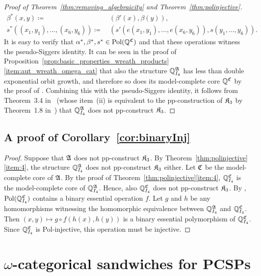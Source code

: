\begin{proof}[Proof of Theorem~\ref{thm:removing_algebraicity} and Theorem~\ref{thm:polinjective}]
\begin{align*}
    \beta^{\ast}(x,y)\coloneqq \ & (\beta'(x),\beta(y)), \\
    s^{\ast}((x_1,y_1),\dots, (x_6,y_6))\coloneqq \ & (s'(e(x_1,y_1),\dots, e(x_6,y_6)),s(y_1,\dots, y_6)).
\end{align*} 
%
It is easy to verify that $\alpha^{\ast},\beta^{\ast},s^{\ast}\in \mathrm{Pol}(\mathbb{Q}^{\mathfrak{C}})$ and that these operations witness the pseudo-Siggers identity.
%
It can be seen in the proof of Proposition~\ref{prop:basic_properties_wreath_products}\eqref{item:aut_wreath_omega_cat} that also the structure $\mathbb{Q}^{\mathfrak{A}}_{I_4}$ has less than double exponential orbit growth, and therefore so does its model-complete core $\mathbb{Q}^{\mathfrak{C}}$ by the proof of \cite[Corollary 1.8]{barto2019equations}. 
%
Combining this with the pseudo-Siggers identity, it follows from Theorem~3.4 in~\cite{barto2019equations} (whose item~(ii) is equivalent to the pp-construction of $\mathfrak{K}_3$ by Theorem~1.8 in~\cite{barto2018wonderland}) that $\mathbb{Q}^{\mathfrak{A}}_{I_4}$ does not pp-construct $\mathfrak{K}_3$.
%  
\end{proof} 
 

\subsection{A proof of Corollary~\ref{cor:binaryInj}}

\binaryInj*

\begin{proof} 
%
Suppose that $\mathfrak{A}$ does not pp-construct $\mathfrak{K}_3$.
%
By Theorem~\ref{thm:polinjective}\eqref{item:4}, the structure $\mathbb{Q}^{\mathfrak{A}}_{I_4}$ does not pp-construct $\mathfrak{K}_3$ either.
%
Let $\mathfrak{C}$ be the model-complete core of $\mathfrak{A}$.
%
By the proof of Theorem~\ref{thm:polinjective}\eqref{item:4}, $\mathbb{Q}^{\mathfrak{C}}_{I_4}$ is the model-complete core of $\mathbb{Q}^{\mathfrak{A}}_{I_4}$.
%
Hence, also $\mathbb{Q}^{\mathfrak{C}}_{I_4}$ does not pp-construct $\mathfrak{K}_3$.
% 
By \cite[Theorem 3.14]{MarimonPinsker23}, $\mathrm{Pol}(\mathbb{Q}^{\mathfrak{C}}_{I_4})$ contains a binary essential operation $f$.    
%
Let $g$ and $h$ be any homomorphisms witnessing the homomorphic equivalence between $\mathbb{Q}^{\mathfrak{A}}_{I_4}$ and $\mathbb{Q}^{\mathfrak{C}}_{I_4}$. 
%
Then $(x,y) \mapsto g \circ f(h(x),h(y))$ is a binary essential polymorphism of 
$\mathbb{Q}^{\mathfrak{C}}_{I_4}$.
%
Since $\mathbb{Q}^{\mathfrak{C}}_{I_4}$ is Pol-injective, this operation must be injective. 
\end{proof}

 
\section{\texorpdfstring{$\omega$}{omega}-categorical sandwiches for PCSPs}


